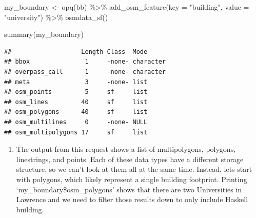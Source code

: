 \documentclass[
  paper=a4,
  ,captions=tableheading
]{scrartcl}
\newenvironment{Shaded}{\begin{snugshade}}{\end{snugshade}}
\newcommand{\AttributeTok}[1]{\textcolor[rgb]{0.77,0.63,0.00}{#1}}
\newcommand{\CommentTok}[1]{\textcolor[rgb]{0.56,0.35,0.01}{\textit{#1}}}
\newcommand{\DecValTok}[1]{\textcolor[rgb]{0.00,0.00,0.81}{#1}}
\newcommand{\FunctionTok}[1]{\textcolor[rgb]{0.00,0.00,0.00}{#1}}
\newcommand{\NormalTok}[1]{#1}
\newcommand{\OtherTok}[1]{\textcolor[rgb]{0.56,0.35,0.01}{#1}}
\newcommand{\SpecialCharTok}[1]{\textcolor[rgb]{0.00,0.00,0.00}{#1}}
\newcommand{\StringTok}[1]{\textcolor[rgb]{0.31,0.60,0.02}{#1}}
\providecommand{\tightlist}{%
  \setlength{\itemsep}{0pt}\setlength{\parskip}{0pt}}
\begin{document}
\begin{Shaded}
\begin{Highlighting}[]
\NormalTok{my\_boundary }\OtherTok{\textless{}{-}} \FunctionTok{opq}\NormalTok{(bb) }\SpecialCharTok{\%\textgreater{}\%} 
  \FunctionTok{add\_osm\_feature}\NormalTok{(}\AttributeTok{key =} \StringTok{"building"}\NormalTok{, }\AttributeTok{value =} \StringTok{"university"}\NormalTok{) }\SpecialCharTok{\%\textgreater{}\%} 
\FunctionTok{osmdata\_sf}\NormalTok{() }

\FunctionTok{summary}\NormalTok{(my\_boundary)}
\end{Highlighting}
\end{Shaded}

\begin{verbatim}
##                   Length Class  Mode     
## bbox               1     -none- character
## overpass_call      1     -none- character
## meta               3     -none- list     
## osm_points         5     sf     list     
## osm_lines         40     sf     list     
## osm_polygons      40     sf     list     
## osm_multilines     0     -none- NULL     
## osm_multipolygons 17     sf     list
\end{verbatim}

\begin{enumerate}
\def\labelenumi{\arabic{enumi}.}
\setcounter{enumi}{2}
\tightlist
\item
  The output from this request shows a list of multipolygons, polygons,
  linestrings, and points. Each of these data types have a different
  storage structure, so we can't look at them all at the same time.
  Instead, lets start with polygons, which likely represent a single
  building footprint. Printing `my\_boundary\$osm\_polygons' shows that
  there are two Universities in Lawrence and we need to filter those
  results down to only include Haskell building.
\end{enumerate}

\begin{Shaded}
\end{Shaded}
\end{document}
